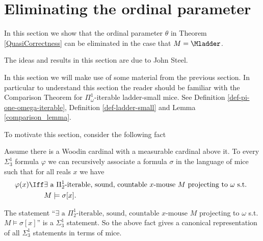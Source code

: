 \documentclass[oneside,12pt]{amsart}
\begin{document}
\section{Eliminating the ordinal parameter}
\label{section:eliminate_ordinal_parameters}

In this section we show that the ordinal parameter $\theta$ in Theorem
\ref{QuasiCorrectness} can be eliminated in the case that $M=\Mladder$.

The ideas and results in this section are due to John Steel.

In this section we will make use of some material from the previous section.
In particular to understand this section the reader should be familiar with
the Comparison Theorem for 
 $\Pi^1_{\omega}$-iterable ladder-small mice.
 See Definition \ref{def-pi-one-omega-iterable},
 Definition \ref{def-ladder-small} and Lemma \ref{comparison_lemma}.

To motivate this section, consider the following fact

\begin{fact}
Assume there is a Woodin cardinal with a measurable cardinal above it. To every $\Sigma^1_3$ formula $\varphi$ we can recursively
associate a formula $\sigma$ in the language of mice such that for all reals $x$ we have
\begin{align*}
\varphi(x) \Iff &\exists \text{ a } \Pi^1_2\text{-iterable, sound, countable } x\text{-mouse } M \text{ projecting to $\omega$ s.t. } \\
                & M\models\sigma[x].
\end{align*}               
\end{fact}

The statement ``$\exists \text{ a } \Pi^1_2\text{-iterable, sound, countable } x\text{-mouse } M$  projecting to $\omega$ s.t. 
$M\models\sigma[x]$'' is a $\Sigma^1_3$ statement.
So the above fact gives a canonical representation of all $\Sigma^1_3$ statements in terms of mice.
\end{document}

